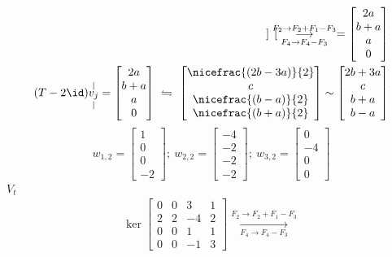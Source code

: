 {{\begin{align*}
\begin{bmatrix}
  \end{bmatrix}\underset{F_4 \to F_4 - F_3}{\overset{F_2 \to F_2 + F_1- F_3}{\longrightarrow}} = \begin{bmatrix}
   2a \\ b+a \\ a \\0 
  \end{bmatrix} \\
  (T-2\id)\overset{|}{\underset{|}{v_j}} = \begin{bmatrix}
   2a \\ b+a \\ a \\0 
  \end{bmatrix} \ \leftrightharpoons \ \begin{bmatrix}
  \nicefrac{(2b-3a)}{2} \\ c \\ \nicefrac{(b-a)}{2} \\ \nicefrac{(b+a)}{2} 
  \end{bmatrix} \sim \begin{bmatrix}
   2b + 3a \\ c \\ b + a  \\ b-  a 
  \end{bmatrix}
\end{align*} }
{\small\[w_{1,2} = \begin{bmatrix}
  1 \\ 0 \\ 0 \\ -2
\end{bmatrix}; \  w_{2,2} = \begin{bmatrix}
-4 \\ -2 \\ -2 \\ -2 
\end{bmatrix}; \ w_{3,2}= \begin{bmatrix}0 \\ -4 \\ 0 \\ 0\end{bmatrix}\]}
\(V_t\) 
{\small \vspace{-0.5cm}\begin{align*}
  \ker \begin{bmatrix}
0 & 0 & 3 & 1 \\ 
2 & 2 & -4 & 2 \\ 
0 & 0 & 1 & 1 \\ 
0 & 0 & -1 & 3    
  \end{bmatrix} \underset{F_4 \to F_4 - F_3}{\overset{F_2 \to F_2 + F_1- F_3}{\longrightarrow}}
\end{align*}}
}


